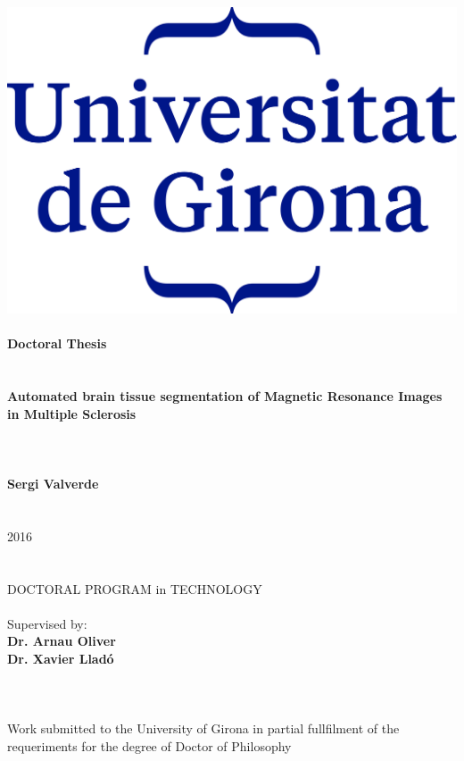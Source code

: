 \hspace{-1.25cm}
\parbox[c]{15cm}{  
  \centering
    \includegraphics[scale = 1]{./figures/logo-udg.png}
    \quad \\
    \quad \\
    \large \textbf{Doctoral Thesis}\\
    \quad \\ ~\\
    {
      \LARGE \textbf{Automated brain tissue segmentation of Magnetic Resonance Images in Multiple Sclerosis }
    }\\~\\
    \quad \\
    \quad \\
    \textbf{Sergi Valverde}\\
    \quad \\
    \quad \\
    2016\\
    \quad \\
    \quad \\
    DOCTORAL PROGRAM in TECHNOLOGY\\
    \quad \\
    Supervised by:\\
    \textbf{ Dr. Arnau Oliver}\\
    \textbf{ Dr. Xavier Llad\'{o}}\\
    \quad \\
    \quad \\~\\
    Work submitted to the University of Girona in partial fullfilment of the requeriments for the degree of Doctor of Philosophy
    \quad \\
    \quad \\
  
}




